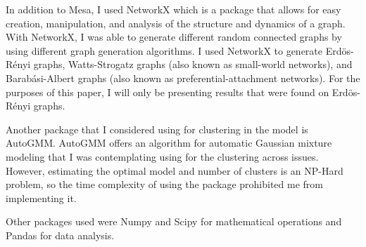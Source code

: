 In addition to Mesa, I used NetworkX which is a package that allows for easy creation, manipulation, and analysis of the structure and dynamics of a graph. With NetworkX, I was able to generate different random connected graphs by using different graph generation algorithms. I used NetworkX to generate Erd\"{o}s-R\'{e}nyi graphs, Watts-Strogatz graphs (also known as small-world networks), and Barab\'{a}si-Albert graphs (also known as preferential-attachment networks). For the purposes of this paper, I will only be presenting results that were found on Erd\"{o}s-R\'{e}nyi graphs. 

Another package that I considered using for clustering in the model is AutoGMM. AutoGMM offers an algorithm for automatic Gaussian mixture modeling that I was contemplating using for the clustering across issues. However, estimating the optimal model and number of clusters is an NP-Hard problem, so the time complexity of using the package prohibited me from implementing it. 

Other packages used were Numpy and Scipy for mathematical operations and Pandas for data analysis. 